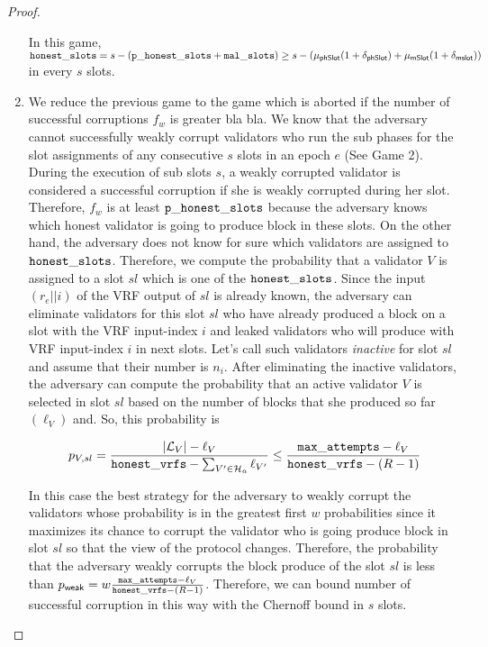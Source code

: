 \begin{proof}
\begin{enumerate}[label={{Game }}{{\arabic*}}]
	 In this game, $ \mathtt{honest\_slots} = s - (\mathtt{p\_honest\_slots} + \mathtt{mal\_slots}) \geq s - (\mu_{\mathsf{phSlot}}(1+\delta_{\mathsf{phSlot}})+ \mu_{\mathsf{mSlot}}(1+\delta_{\mathsf{mslot}})) $ in every $ s $ slots.
	 \item We reduce the previous game to the game which is aborted if the number of successful corruptions $ f_w $ is greater bla bla. We know that the adversary cannot successfully weakly corrupt validators who run the sub phases for the slot assignments of any consecutive $ s $ slots in an epoch $ e $ (See Game 2). During the execution of sub slots $ s $, a weakly corrupted validator is considered a successful corruption if she is weakly corrupted during her slot. Therefore, $ f_w $ is at least $ \mathtt{p\_honest\_slots} $ because the adversary knows which honest validator is going to produce block in these slots. On the other hand, the adversary does not know for sure which validators are assigned to $ \mathtt{honest\_slots} $. Therefore, we compute the probability that a validator $ V $ is assigned to a slot $ sl $ which is one of the $ \mathtt{honest\_slots} $.
	 Since the input $ (r_e||i) $ of the VRF output of $ sl $ is already known, the adversary can eliminate validators for this slot $ sl $ who have already produced a block on a slot with the VRF input-index $ i $ and leaked validators who will produce with VRF input-index $ i $ in next slots. Let's call such validators \emph{inactive} for slot $ sl $ and assume that their number is $ n_i $. After eliminating the inactive validators, the adversary can compute the probability that an active validator $ V $ is selected in slot $ sl $ based on the number of blocks that she produced so far $ (\ell_V) $ and. So, this probability is
	 
	 
	 \begin{equation}\label{eq:prVs}
	 	p_{V,sl} = \frac{|\mathcal{L}_V|- \ell_V}{\mathtt{honest\_vrfs} - \sum_{V' \in \mathcal{H}_a}\ell_{V'}}\leq \frac{\mathtt{max\_attempts} - \ell_V}{\mathtt{honest\_vrfs} - (R-1)}
	 \end{equation}

	 
	 In this case the best strategy for the adversary to weakly corrupt the validators whose probability is in the greatest first $ w $ probabilities since it maximizes its chance to corrupt the validator who is going produce block in slot $ sl $ so that the view of the protocol changes. Therefore, the probability that the adversary weakly corrupts the block produce of the slot $ sl  $ is less than $p_{\mathsf{weak}} = w \frac{\mathtt{max\_attempts} - \ell_V}{\mathtt{honest\_vrfs} - (R-1)} $. Therefore, we can bound  number of successful corruption in this way with the Chernoff bound in $ s $  slots.
	 

\end{enumerate}
\end{proof}
